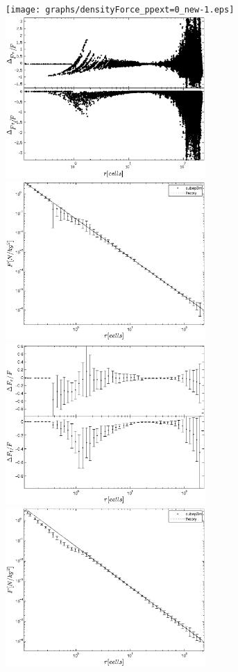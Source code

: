 \documentclass[useAMS,usenatbib]{mn2e}
\begin{document}
\begin{figure}%
  \begin{center}
    \texttt{[image: graphs/densityForce\_ppext=0\_new-1.eps]}
    \includegraphics[width=3.0in]{graphs/densityForce_fracErr_ppext=0_new-1.eps}
    \includegraphics[width=3.0in]{graphs/densityForce_ppext=0_rebin_new-1.eps}
    \includegraphics[width=3.0in]{graphs/densityForce_fracErr_ppext=0_rebin_new-1.eps}
    \includegraphics[width=3.0in]{graphs/densityForce_ppext=0_rebin_N10_new-1.eps}

\end{center}
\end{figure}
\end{document}
